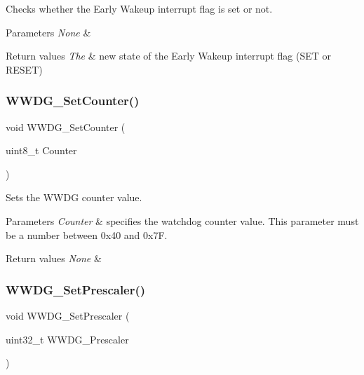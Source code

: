 Checks whether the Early Wakeup interrupt flag is set or not. 


\begin{DoxyParams}{Parameters}
{\em None} & \\
\hline
\end{DoxyParams}

\begin{DoxyRetVals}{Return values}
{\em The} & new state of the Early Wakeup interrupt flag (S\+ET or R\+E\+S\+ET) \\
\hline
\end{DoxyRetVals}
\mbox{\label{group___w_w_d_g___private___functions_ga6e44cc35f133b28b9ad861f459bf8d76}} 
\subsubsection{\texorpdfstring{WWDG\_SetCounter()}{WWDG\_SetCounter()}}
{\footnotesize\ttfamily void W\+W\+D\+G\+\_\+\+Set\+Counter (\begin{DoxyParamCaption}\item[{uint8\+\_\+t}]{Counter }\end{DoxyParamCaption})}



Sets the W\+W\+DG counter value. 


\begin{DoxyParams}{Parameters}
{\em Counter} & specifies the watchdog counter value. This parameter must be a number between 0x40 and 0x7F. \\
\hline
\end{DoxyParams}

\begin{DoxyRetVals}{Return values}
{\em None} & \\
\hline
\end{DoxyRetVals}
\mbox{\label{group___w_w_d_g___private___functions_gafeaa2b52c31ba7baca7eb61d2d42e07b}} 
\subsubsection{\texorpdfstring{WWDG\_SetPrescaler()}{WWDG\_SetPrescaler()}}
{\footnotesize\ttfamily void W\+W\+D\+G\+\_\+\+Set\+Prescaler (\begin{DoxyParamCaption}\item[{uint32\+\_\+t}]{W\+W\+D\+G\+\_\+\+Prescaler }\end{DoxyParamCaption})}



